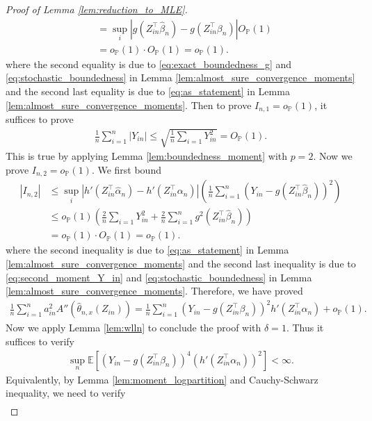 \documentclass[12pt]{article}
\theoremstyle{definition}
\def\P{\mathbb{P}}
\def\P{\mathbb{P}}
\newcommand{\E}{\mathbb E}								%
\renewcommand{\P}{\mathbb{P}}							%
\newcommand{\srz}{Z}									%
\newcommand{\sry}{Y}									%
\begin{document}
\begin{proof}[Proof of Lemma \ref{lem:reduction_to_MLE}]
\begin{align*}
      &
      =\sup_i|g(\srz_{in}^\top\widehat{\beta}_n)-g(\srz_{in}^\top\beta_n)|O_{\P}(1)\\
      &
      =o_{\P}(1)\cdot O_{\P}(1)=o_{\P}(1).
    \end{align*}
    where the second equality is due to \eqref{eq:exact_boundedness_g} and \eqref{eq:stochastic_boundedness} in Lemma \ref{lem:almost_sure_convergence_moments} and the second last equality is due to \eqref{eq:as_statement} in Lemma \ref{lem:almost_sure_convergence_moments}. Then to prove $I_{n,1}=o_{\P}(1)$, it suffices to prove 
    \begin{align}\label{eq:second_moment_Y_in}
      \frac{1}{n}\sum_{i=1}^n |\sry_{in}|\leq \sqrt{\frac{1}{n}\sum_{i=1}\sry_{in}^2}=O_{\P}(1).
    \end{align}
    This is true by applying Lemma \ref{lem:boundedness_moment} with $p=2$. Now we prove $I_{n,2}=o_{\P}(1)$. We first bound 
    \begin{align*}
      |I_{n,2}|
      &
      \leq \sup_{i}|h'(\srz_{in}^\top \widehat{\alpha}_n)-h'(\srz_{in}^\top \alpha_n)|\left(\frac{1}{n}\sum_{i=1}^n (\sry_{in}-g(\srz_{in}^\top \widehat{\beta}_n))^2\right)\\
      &
      \leq o_{\P}(1)\left(\frac{2}{n}\sum_{i=1}\sry_{in}^2+\frac{2}{n}\sum_{i=1}^n g^2(\srz_{in}^\top \widehat{\beta}_n)\right)\\
      &
      =o_{\P}(1)\cdot O_{\P}(1)=o_{\P}(1).
    \end{align*}
    where the second inequality is due to \eqref{eq:as_statement} in Lemma \ref{lem:almost_sure_convergence_moments} and the second last inequality is due to \eqref{eq:second_moment_Y_in} and \eqref{eq:stochastic_boundedness} in Lemma \ref{lem:almost_sure_convergence_moments}. Therefore, we have proved 
    \begin{align*}
      \frac{1}{n}\sum_{i=1}^n a_{in}^2A''(\widehat \theta_{n,x}(\srz_{in}))= \frac{1}{n}\sum_{i=1}^n (\sry_{in}-g(\srz_{in}^\top \beta_n))^2h'(\srz_{in}^\top \alpha_n)+o_{\P}(1).
    \end{align*}
    Now we apply Lemma \ref{lem:wlln} to conclude the proof with $\delta=1$. Thus it suffices to verify
    \begin{align}\label{eq:sufficient_condition_wlln}
      \sup_n \E[(\sry_{in}-g(\srz_{in}^\top \beta_n))^4(h'(\srz_{in}^\top \alpha_n))^2] <\infty.
    \end{align}
    Equivalently, by Lemma \ref{lem:moment_logpartition} and Cauchy-Schwarz inequality, we need to verify 
    \begin{align*}

\end{align*}
\end{proof}
\end{document}
